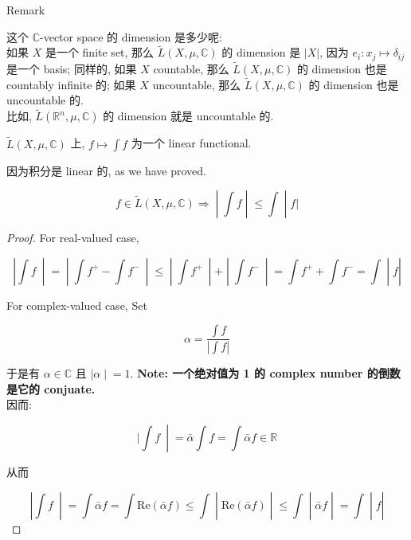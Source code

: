 \documentclass{qlnotes-export}
\begin{document}
\begin{qlremark}{Remark}

这个 \(\mathbb{C}\)-vector space 的 dimension 是多少呢:\\
如果 \(X\) 是一个 finite set, 那么 \(\widetilde{L}(X,\mu,{\mathbb{C}})\) 的 dimension 是 \(|X|\), 因为 \(e_{i}:x_{j}\mapsto\delta_{ij}\) 是一个 basis; 同样的, 如果 \(X\) countable, 那么 \(\widetilde{L}(X,\mu,{\mathbb{C}})\) 的 dimension 也是 countably infinite 的; 如果 \(X\) uncountable, 那么 \(\widetilde{L}(X,\mu,{\mathbb{C}})\) 的 dimension 也是 uncountable 的.\\
比如, \(\widetilde{L}({\mathbb{R}}^{n},\mu,{\mathbb{C}})\) 的 dimension 就是 uncountable 的.

\end{qlremark}

\begin{proposition}\label{prop-05-integration-of-real-and-complex-functions-proposition-002}

\(\widetilde{L}(X,\mu,{\mathbb{C}})\) 上, \(f\mapsto\int f\) 为一个 linear functional.

\end{proposition}

因为积分是 linear 的, as we have proved.

\begin{proposition}\label{prop-05-integration-of-real-and-complex-functions-proposition-003}

\[\left. f \in \widetilde{L}(X,\mu,{\mathbb{C}})\Longrightarrow \middle| \int f \middle| \leq \int \middle| f| \right.\]

\end{proposition}

\begin{proof}

For real-valued case,

\[\left. |\int f\  \middle| = \middle| \int f^{+} - \int f^{-}\  \middle| \leq \middle| \int f^{+}\  \middle| + \middle| \int f^{-}\  \middle| = \int f^{+} + \int f^{-} = \int \middle| f| \right.\]

For complex-valued case, Set

\[\alpha = \frac{\int f}{|\int f|}\]

于是有 \(\alpha \in {\mathbb{C}}\) 且 \(\left. |\alpha \middle| = 1 \right.\). \textbf{Note: 一个绝对值为 1 的 complex number 的倒数是它的 conjuate.}\\
因而:

\[\left. |\int f\  \middle| = \bar{\alpha}\int f = \int\bar{\alpha}f \in {\mathbb{R}} \right.\]

从而

\[\left. |\int f\  \middle| = \int\bar{\alpha}f = \int\text{Re}(\bar{\alpha}f) \leq \int \middle| \text{Re}(\bar{\alpha}f) \middle| \leq \int \middle| \bar{\alpha}f \middle| = \int \middle| f| \right.\]

\end{proof}
\end{document}
